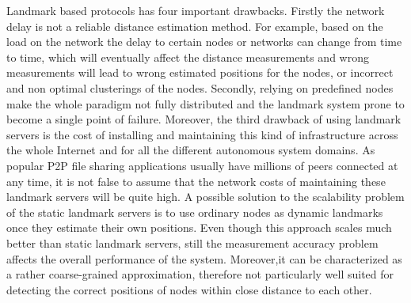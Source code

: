 Landmark based protocols has four important drawbacks. Firstly the network
delay is not a reliable distance estimation method. For example, based on the
load on the network the delay to certain nodes or networks can change from time
to time, which will eventually affect the distance measurements and wrong
measurements will lead to wrong estimated positions for the nodes, or incorrect
and non optimal clusterings of the nodes. Secondly, relying on predefined nodes
make the whole paradigm not fully distributed and the landmark system prone to
become a single point of failure. Moreover, the third drawback of using
landmark servers is the cost of installing and maintaining this kind of
infrastructure across the whole Internet and for all the different autonomous
system domains. As popular P2P file sharing applications usually have millions
of peers connected at any time, it is not false to assume that the network costs
of maintaining these landmark servers will be quite high. A possible solution to
the scalability problem of the static landmark servers is to use ordinary nodes
as dynamic landmarks once they estimate their own positions. Even though this
approach scales much better than static landmark servers, still the measurement
accuracy problem affects the overall performance of the system. Moreover,it can
be characterized as a rather coarse-grained approximation, therefore not
particularly well suited for detecting the correct positions of nodes within
close distance to each other.



